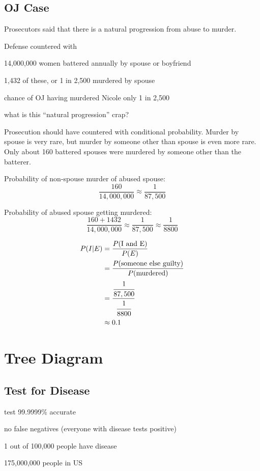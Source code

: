 \documentclass[letterpaper, landscape]{exam}
\begin{document}
  \subsection{OJ Case}
  Prosecutors said that there is a natural progression from abuse to murder.

  Defense countered with 
  \begin{itemize*}
    \item 14,000,000 women battered annually by spouse or boyfriend
    \item 1,432 of these, or 1 in 2,500 murdered by spouse
    \item chance of OJ having murdered Nicole only 1 in 2,500
    \item what is this ``natural progression'' crap?
  \end{itemize*}

  Prosecution should have countered with conditional probability. Murder by
  spouse is very rare, but murder by someone other than spouse is even more
  rare. Only about 160 battered spouses were murdered by someone other than
  the batterer.

  Probability of non-spouse murder of abused spouse:
  \[
    \frac{160}{14,000,000} \approx \frac{1}{87,500}
  \]

  Probability of abused spouse getting murdered:
  \[
    \frac{160 + 1432}{14,000,000} \approx \frac{1}{87,500} 
      \approx \frac{1}{8800}
  \]

  \begin{align*}
    P(I | E) & = \frac{P(\text{I and E})}{P(E)} \\
             & = \frac{P(\text{someone else guilty})}{P(\text{murdered})} \\
             & = \frac{\cfrac{1}{87,500}}{\cfrac{1}{8800}} \\
             & \approx 0.1 \\
  \end{align*}

  \section{Tree Diagram}

  \subsection{Test for Disease}

  \begin{itemize*}
    \item test 99.9999\% accurate
    \item no false negatives (everyone with disease tests positive)
    \item 1 out of 100,000 people have disease
    \item 175,000,000 people in US
  \end{itemize*}
\end{document}
